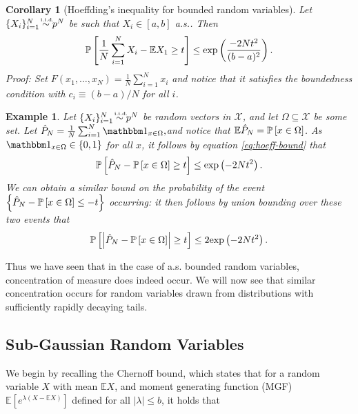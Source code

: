 \documentclass{article}[12pt]
\newtheorem{corollary}{Corollary}
\newtheorem{ex}{Example}
\def\E{\mathbb{E}}
\def \E{\mathbb E}
\begin{document}
\begin{corollary}[Hoeffding's inequality for bounded random variables] Let $\{X_i\}_{i=1}^N \iid p^N$ be such that $X_i \in [a,b]$ a.s..  Then
\begin{equation}
\Prob{\frac{1}{N}\sum_{i=1}^N X_i - \E X_1 \geq t} \leq \exp{\frac{-2Nt^2}{(b-a)^2}}.
\label{eq:hoeff-bound}
\end{equation}
Proof: Set $F(x_1,\dots,x_N) = \frac{1}{N}\sum_{i=1}^N x_i$ and notice that it satisfies the boundedness condition  with $c_i \equiv (b-a)/N$ for all $i$.
\end{corollary}


\begin{ex}
 Let $\{X_i\}_{i=1}^N \iid p^N$ be random vectors in $\mathcal{X}$, and let $\Omega \subseteq \mathcal{X}$ be some set.  Let $\hat{P}_N = \frac{1}{N} \sum_{i=1}^N \Ind{x \in \Omega},$and notice that $\E\hat{P}_N = \Prob{x \in \Omega}$.  As $\Ind{x \in \Omega} \in \{0,1\}$ for all $x$, it follows by equation \eqref{eq:hoeff-bound} that
\begin{equation}
\mathbb{P}\left[\hat{P}_N - \mathbb{P}\left[x \in \Omega\right] \geq t\right] \leq \mathrm{exp}\left(-2Nt^2\right).
\end{equation}
We can obtain a similar bound on the probability of the event $\left\{\hat P_N - \mathbb{P}\left[x \in \Omega\right] \leq -t\right\}$ occurring: it then follows by union bounding over these two events that
\begin{equation}
\mathbb{P}\left[\left|\hat{P}_N - \mathbb{P}\left[x \in \Omega\right] \right|\geq t\right] \leq 2\mathrm{exp}\left(-2Nt^2\right).
\end{equation}
\end{ex}
 
 Thus we have seen that in the case of a.s. bounded random variables, concentration of measure does indeed occur.
We will now see that similar concentration occurs for random variables drawn from distributions with sufficiently rapidly decaying tails.  
 
 \subsection{Sub-Gaussian Random Variables}
 We begin by recalling the Chernoff bound, which states that for a random variable $X$ with mean $\E X$, and moment generating function (MGF) $\E\left[e^{\lambda(X-\E X)}\right]$ defined for all $|\lambda|\leq b$, it holds that
 
\end{document}
